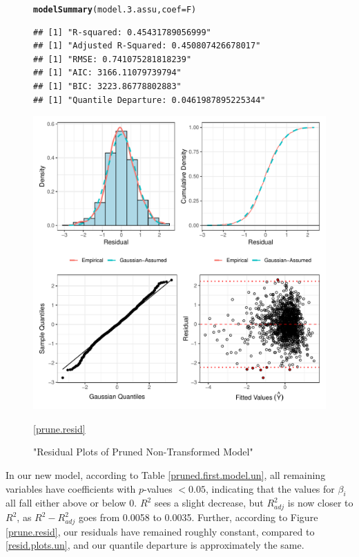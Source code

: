\documentclass{article}\usepackage[]{graphicx}\usepackage[]{xcolor}
\makeatletter
\def\maxwidth{ %
  \ifdim\Gin@nat@width>\linewidth
    \linewidth
  \else
    \Gin@nat@width
  \fi
}
\newcommand{\hlstd}[1]{\textcolor[rgb]{0.345,0.345,0.345}{#1}}%
\newcommand{\hlkwc}[1]{\textcolor[rgb]{0.333,0.667,0.333}{#1}}%
\newcommand{\hlkwd}[1]{\textcolor[rgb]{0.737,0.353,0.396}{\textbf{#1}}}%
\newenvironment{kframe}{%
 \def\at@end@of@kframe{}%
 \ifinner\ifhmode%
  \def\at@end@of@kframe{\end{minipage}}%
  \begin{minipage}{\columnwidth}%
 \fi\fi%
 \def\FrameCommand##1{\hskip\@totalleftmargin \hskip-\fboxsep
 \colorbox{shadecolor}{##1}\hskip-\fboxsep
     \hskip-\linewidth \hskip-\@totalleftmargin \hskip\columnwidth}%
 \MakeFramed {\advance\hsize-\width
   \@totalleftmargin\z@ \linewidth\hsize
   \@setminipage}}%
 {\par\unskip\endMakeFramed%
 \at@end@of@kframe}
\newenvironment{knitrout}{}{} %
\makeatother
\begin{document}
\begin{figure}
\begin{knitrout}
\color{fgcolor}\begin{kframe}
\begin{alltt}
\hlkwd{modelSummary}\hlstd{(model.3.assu,} \hlkwc{coef}\hlstd{=F)}
\end{alltt}
\begin{verbatim}
## [1] "R-squared: 0.45431789056999"
## [1] "Adjusted R-Squared: 0.450807426678017"
## [1] "RMSE: 0.741075281818239"
## [1] "AIC: 3166.11079739794"
## [1] "BIC: 3223.86778802883"
## [1] "Quantile Departure: 0.0461987895225344"
\end{verbatim}
\end{kframe}
\includegraphics[width=\maxwidth]{figure/unnamed-chunk-16-1} 
\end{knitrout}
\caption{"Residual Plots of Pruned Non-Transformed Model"}
\ref{prune.resid}
\end{figure}

In our new model, according to Table \ref{pruned.first.model.un}, all remaining variables have coefficients with $p$-values $< 0.05$, indicating that the values for $\beta_i$ all fall either above or below 0. $R^2$ sees a slight decrease, but $R^2_{adj}$ is now closer to $R^2$, as $R^2 - R^2_{adj}$ goes from 0.0058 to 0.0035. Further, according to Figure \ref{prune.resid}, our residuals have remained roughly constant, compared to \ref{resid.plots.un}, and our quantile departure is approximately the same.
\end{document}
